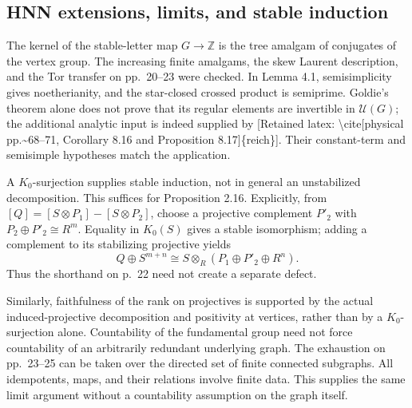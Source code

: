\documentclass[10pt]{article}
\begin{document}
\subsection*{HNN extensions, limits, and stable induction}
The kernel of the stable-letter map \(G\to\mathbb Z\) is the tree amalgam of conjugates of the vertex group. The increasing finite amalgams, the skew Laurent description, and the Tor transfer on pp. 20–23 were checked. In Lemma 4.1, semisimplicity gives noetherianity, and the star-closed crossed product is semiprime. Goldie’s theorem alone does not prove that its regular elements are invertible in \(\mathcal U(G)\); the additional analytic input is indeed supplied by [Retained latex: \textbackslash{}cite[physical pp.\textasciitilde{}68--71, Corollary 8.16 and
Proposition 8.17]\{reich\}]. Their constant-term and semisimple hypotheses match the application.\par
A \(K_0\)-surjection supplies stable induction, not in general an unstabilized decomposition. This suffices for Proposition 2.16. Explicitly, from \([Q]=[S\otimes P_1]-[S\otimes P_2]\), choose a projective complement \(P'_2\) with \(P_2\oplus P'_2\cong R^m\). Equality in \(K_0(S)\) gives a stable isomorphism; adding a complement to its stabilizing projective yields \[Q\oplus S^{m+n}\cong S\otimes_R(P_1\oplus P'_2\oplus R^n).\] Thus the shorthand on p. 22 need not create a separate defect.\par
Similarly, faithfulness of the rank on projectives is supported by the actual induced-projective decomposition and positivity at vertices, rather than by a \(K_0\)-surjection alone. Countability of the fundamental group need not force countability of an arbitrarily redundant underlying graph. The exhaustion on pp. 23–25 can be taken over the directed set of finite connected subgraphs. All idempotents, maps, and their relations involve finite data. This supplies the same limit argument without a countability assumption on the graph itself.\par
\end{document}
